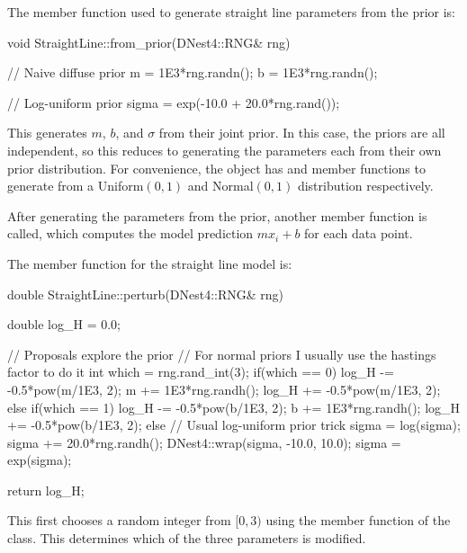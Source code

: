 \documentclass[article]{jss}
\begin{document}


The member function used to generate straight line parameters from the
prior is:

\begin{CodeChunk}
\begin{CodeInput}
void StraightLine::from_prior(DNest4::RNG& rng)
{
   // Naive diffuse prior
   m = 1E3*rng.randn();
   b = 1E3*rng.randn();

   // Log-uniform prior
   sigma = exp(-10.0 + 20.0*rng.rand());
}
\end{CodeInput}
\end{CodeChunk}

This generates $m$, $b$, and $\sigma$ from their joint prior. In this case,
the priors are all independent, so this reduces to generating the parameters
each from their own prior distribution. For convenience, the  object
has  and  member functions to generate from
a Uniform$(0,1)$ and Normal$(0,1)$ distribution respectively.

After generating the parameters from the prior, another member function
 is called, which computes the model prediction
$mx_i + b$ for each data point.

The  member function for the straight line model is:
\begin{CodeChunk}
\begin{CodeInput}
double StraightLine::perturb(DNest4::RNG& rng)
{
	double log_H = 0.0;

	// Proposals explore the prior
	// For normal priors I usually use the hastings factor to do it
	int which = rng.rand_int(3);
	if(which == 0)
	{
		log_H -= -0.5*pow(m/1E3, 2);
		m += 1E3*rng.randh();
		log_H += -0.5*pow(m/1E3, 2);
	}
	else if(which == 1)
	{
		log_H -= -0.5*pow(b/1E3, 2);
		b += 1E3*rng.randh();
		log_H += -0.5*pow(b/1E3, 2);
	}
	else
	{
		// Usual log-uniform prior trick
		sigma = log(sigma);
		sigma += 20.0*rng.randh();
		DNest4::wrap(sigma, -10.0, 10.0);
		sigma = exp(sigma);
	}

	return log_H;
}
\end{CodeInput}
\end{CodeChunk}

This first chooses a random integer from $[0, 3)$ using the
 member function of the  class.
This determines which of the three parameters is modified.
\end{document}
